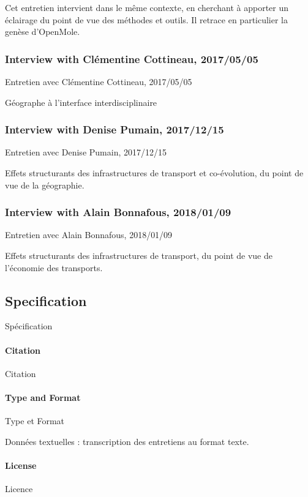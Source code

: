 Cet entretien intervient dans le même contexte, en cherchant à apporter un éclairage du point de vue des méthodes et outils. Il retrace en particulier la genèse d'OpenMole.

\subsubsection{Interview with Clémentine Cottineau, 2017/05/05}{Entretien avec Clémentine Cottineau, 2017/05/05}

Géographe à l'interface interdisciplinaire




\subsubsection{Interview with Denise Pumain, 2017/12/15}{Entretien avec Denise Pumain, 2017/12/15}

Effets structurants des infrastructures de transport et co-évolution, du point de vue de la géographie.




\subsubsection{Interview with Alain Bonnafous, 2018/01/09}{Entretien avec Alain Bonnafous, 2018/01/09}



Effets structurants des infrastructures de transport, du point de vue de l'économie des transports.



\subsection{Specification}{Spécification}

\paragraph{Citation}{Citation}

\paragraph{Type and Format}{Type et Format}

Données textuelles : transcription des entretiens au format texte.

\paragraph{License}{Licence}

